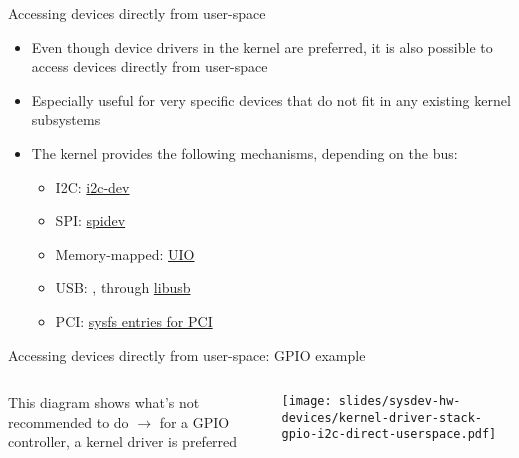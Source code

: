 \begin{frame}{Accessing devices directly from user-space}
  \begin{itemize}
  \item Even though device drivers in the kernel are preferred, it is
    also possible to access devices directly from user-space
  \item Especially useful for very specific devices that do not fit in
    any existing kernel subsystems
  \item The kernel provides the following mechanisms, depending on the
    bus:
    \begin{itemize}
    \item I2C: \href{https://docs.kernel.org/i2c/dev-interface.html}{i2c-dev}
    \item SPI: \href{https://docs.kernel.org/spi/spidev.html}{spidev}
    \item Memory-mapped: \href{https://docs.kernel.org/driver-api/uio-howto.html}{UIO}
    \item USB: , through \href{https://libusb.info/}{libusb}
    \item PCI: \href{https://docs.kernel.org/PCI/sysfs-pci.html}{sysfs entries for PCI}
    \end{itemize}
  \end{itemize}
\end{frame}

\begin{frame}{Accessing devices directly from user-space: GPIO example}
  \begin{columns}[T]
     {\small This diagram shows what's not
      recommended to do $\rightarrow$ for a GPIO controller, a kernel driver
      is preferred}
    \begin{center}
      \texttt{[image: slides/sysdev-hw-devices/kernel-driver-stack-gpio-i2c-direct-userspace.pdf]}\\
    \end{center}
  \end{columns}
\end{frame}

